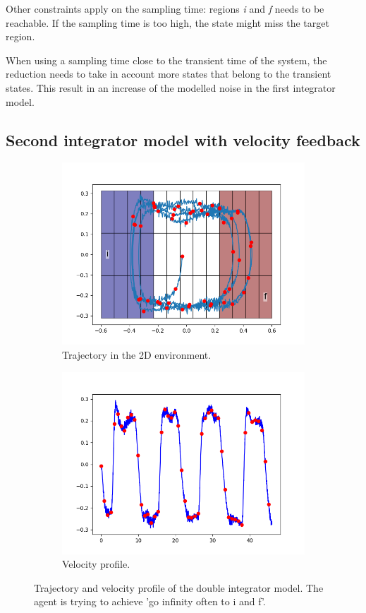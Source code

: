 \documentclass{article}
\theoremstyle{named}
\begin{document}
\newcommand{\reg}[1]{\textit{#1}}
Other constraints apply on the sampling time: regions \reg{i} and \reg{f} needs to be reachable. If the sampling time is too high, the state might miss the target region.

When using a sampling time close to the transient time of the system, the reduction needs to take in account more states that belong to the transient states. This result in an increase of the modelled noise in the first integrator model.

\subsection{Second integrator model with velocity feedback}

\begin{figure}[!ht]
	\begin{subfigure}[b]{0.5\textwidth}
  		\centering
  		\includegraphics[width=0.9\linewidth]{double_1D}
	  	\caption{Trajectory in the 2D environment.}
	  	\label{double_1D}
  \end{subfigure}
	\begin{subfigure}[b]{0.5\textwidth}
  		\centering
  		\includegraphics[width=0.9\linewidth]{double_1D_vel}
	  	\caption{Velocity profile.}
	  	\label{double_1D_vel}
  \end{subfigure}
  \caption{Trajectory and velocity profile of the double integrator model. The agent is trying to achieve 'go infinity often to i and f'.}
\end{figure}
\end{document}
